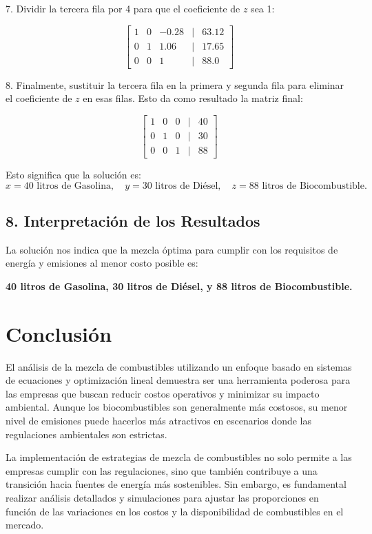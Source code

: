 \documentclass[]{article}
\begin{document}
	7. Dividir la tercera fila por 4 para que el coeficiente de \(z\) sea 1:
	
	\[
	\begin{bmatrix}
		1 & 0 & -0.28 & | & 63.12 \\
		0 & 1 & 1.06 & | & 17.65 \\
		0 & 0 & 1 & | & 88.0
	\end{bmatrix}
	\]
	
	8. Finalmente, sustituir la tercera fila en la primera y segunda fila para eliminar el coeficiente de \(z\) en esas filas. Esto da como resultado la matriz final:
	
	\[
	\begin{bmatrix}
		1 & 0 & 0 & | & 40 \\
		0 & 1 & 0 & | & 30 \\
		0 & 0 & 1 & | & 88
	\end{bmatrix}
	\]
	
	Esto significa que la solución es:
	\[
	x = 40 \text{ litros de Gasolina}, \quad y = 30 \text{ litros de Diésel}, \quad z = 88 \text{ litros de Biocombustible}.
	\]
	
	\subsection*{8. Interpretación de los Resultados}
	La solución nos indica que la mezcla óptima para cumplir con los requisitos de energía y emisiones al menor costo posible es:
	\begin{center}
		\textbf{40 litros de Gasolina, 30 litros de Diésel, y 88 litros de Biocombustible.}
	\end{center}
	
	\section*{Conclusión}
	El análisis de la mezcla de combustibles utilizando un enfoque basado en sistemas de ecuaciones y optimización lineal demuestra ser una herramienta poderosa para las empresas que buscan reducir costos operativos y minimizar su impacto ambiental. Aunque los biocombustibles son generalmente más costosos, su menor nivel de emisiones puede hacerlos más atractivos en escenarios donde las regulaciones ambientales son estrictas.
	
	La implementación de estrategias de mezcla de combustibles no solo permite a las empresas cumplir con las regulaciones, sino que también contribuye a una transición hacia fuentes de energía más sostenibles. Sin embargo, es fundamental realizar análisis detallados y simulaciones para ajustar las proporciones en función de las variaciones en los costos y la disponibilidad de combustibles en el mercado.
	
\end{document}

